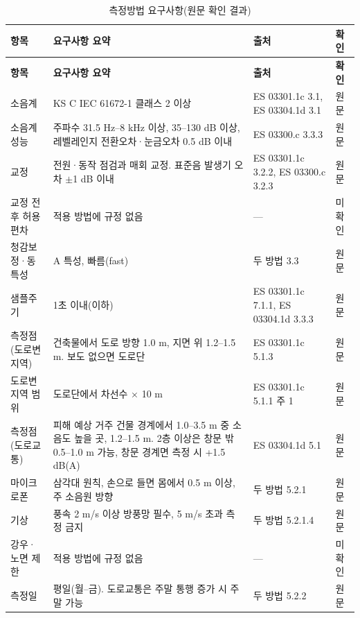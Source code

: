 \documentclass[10.5pt,a4paper]{article}
\newcommand{\hd}[1]{\cellcolor{headfill}\textbf{\sffamily #1}}
\begin{document}
\begin{longtable}{>{\raggedright\arraybackslash}p{}>{\raggedright\arraybackslash}p{}>{\raggedright\arraybackslash}p{}>{\raggedright\arraybackslash}p{}}
\caption{측정방법 요구사항(원문 확인 결과)}\\
\toprule
\hd{항목} & \hd{요구사항 요약} & \hd{출처} & \hd{확인} \\ \midrule
\endfirsthead
\toprule
\hd{항목} & \hd{요구사항 요약} & \hd{출처} & \hd{확인} \\ \midrule
\endhead
\bottomrule
\endlastfoot
소음계 & KS C IEC 61672-1 클래스 2 이상 & ES 03301.1c 3.1, ES 03304.1d 3.1 & 원문 \\ \midrule
소음계 성능 & 주파수 31.5 Hz--8 kHz 이상, 35--130 dB 이상, 레벨레인지 전환오차·눈금오차 0.5 dB 이내 & ES 03300.c 3.3.3 & 원문 \\ \midrule
교정 & 전원·동작 점검과 매회 교정. 표준음 발생기 오차 $\pm$1 dB 이내 & ES 03301.1c 3.2.2, ES 03300.c 3.2.3 & 원문 \\ \midrule
교정 전후 허용 편차 & 적용 방법에 규정 없음 & --- & 미확인 \\ \midrule
청감보정·동특성 & A 특성, 빠름(fast) & 두 방법 3.3 & 원문 \\ \midrule
샘플주기 & 1초 이내(이하) & ES 03301.1c 7.1.1, ES 03304.1d 3.3.3 & 원문 \\ \midrule
측정점(도로변지역) & 건축물에서 도로 방향 1.0 m, 지면 위 1.2--1.5 m. 보도 없으면 도로단 & ES 03301.1c 5.1.3 & 원문 \\ \midrule
도로변지역 범위 & 도로단에서 차선수 $\times$ 10 m & ES 03301.1c 5.1.1 주 1 & 원문 \\ \midrule
측정점(도로교통) & 피해 예상 거주 건물 경계에서 1.0--3.5 m 중 소음도 높을 곳, 1.2--1.5 m. 2층 이상은 창문 밖 0.5--1.0 m 가능, 창문 경계면 측정 시 +1.5 dB(A) & ES 03304.1d 5.1 & 원문 \\ \midrule
마이크로폰 & 삼각대 원칙, 손으로 들면 몸에서 0.5 m 이상, 주 소음원 방향 & 두 방법 5.2.1 & 원문 \\ \midrule
기상 & 풍속 2 m/s 이상 방풍망 필수, 5 m/s 초과 측정 금지 & 두 방법 5.2.1.4 & 원문 \\ \midrule
강우·노면 제한 & 적용 방법에 규정 없음 & --- & 미확인 \\ \midrule
측정일 & 평일(월--금). 도로교통은 주말 통행 증가 시 주말 가능 & 두 방법 5.2.2 & 원문 \\ \midrule

\end{longtable}
\end{document}
